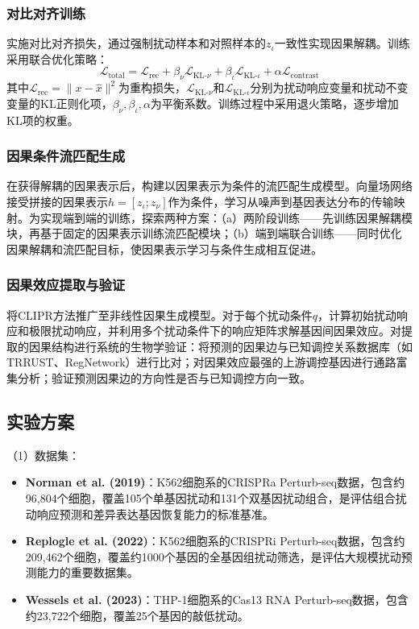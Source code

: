 \subsubsection{对比对齐训练}

实施对比对齐损失，通过强制扰动样本和对照样本的$z_\iota$一致性实现因果解耦。训练采用联合优化策略：
\begin{equation}
\mathcal{L}_{\text{total}} = \mathcal{L}_{\text{rec}} + \beta_\nu \mathcal{L}_{\text{KL-}\nu} + \beta_\iota \mathcal{L}_{\text{KL-}\iota} + \alpha \mathcal{L}_{\text{contrast}}
\end{equation}
其中$\mathcal{L}_{\text{rec}} = \|x - \hat{x}\|^2$为重构损失，$\mathcal{L}_{\text{KL-}\nu}$和$\mathcal{L}_{\text{KL-}\iota}$分别为扰动响应变量和扰动不变变量的KL正则化项，$\beta_\nu, \beta_\iota, \alpha$为平衡系数。训练过程中采用退火策略，逐步增加KL项的权重。

\subsubsection{因果条件流匹配生成}

在获得解耦的因果表示后，构建以因果表示为条件的流匹配生成模型。向量场网络接受拼接的因果表示$h = [z_\iota; z_\nu]$作为条件，学习从噪声到基因表达分布的传输映射。为实现端到端的训练，探索两种方案：（a）两阶段训练——先训练因果解耦模块，再基于固定的因果表示训练流匹配模块；（b）端到端联合训练——同时优化因果解耦和流匹配目标，使因果表示学习与条件生成相互促进。

\subsubsection{因果效应提取与验证}

将CLIPR方法推广至非线性因果生成模型。对于每个扰动条件$q$，计算初始扰动响应和极限扰动响应，并利用多个扰动条件下的响应矩阵求解基因间因果效应。对提取的因果结构进行系统的生物学验证：将预测的因果边与已知调控关系数据库（如TRRUST、RegNetwork）进行比对；对因果效应最强的上游调控基因进行通路富集分析；验证预测因果边的方向性是否与已知调控方向一致。

\subsection{实验方案}

（1）数据集：
\begin{itemize}
    \item \textbf{Norman et al. (2019)}：K562细胞系的CRISPRa Perturb-seq数据，包含约96,804个细胞，覆盖105个单基因扰动和131个双基因扰动组合，是评估组合扰动响应预测和差异表达基因恢复能力的标准基准。
    \item \textbf{Replogle et al. (2022)}：K562细胞系的CRISPRi Perturb-seq数据，包含约209,462个细胞，覆盖约1000个基因的全基因组扰动筛选，是评估大规模扰动预测能力的重要数据集。
    \item \textbf{Wessels et al. (2023)}：THP-1细胞系的Cas13 RNA Perturb-seq数据，包含约23,722个细胞，覆盖25个基因的敲低扰动。
\end{itemize}

